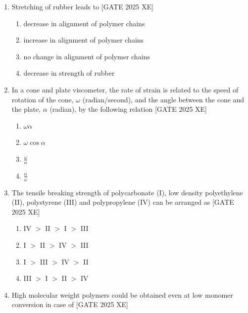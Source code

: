 \documentclass[journal,12pt,onecolumn]{IEEEtran}
\theoremstyle{remark}
\begin{document}
\begin{enumerate}
\item Stretching of rubber leads to \hfill[GATE 2025 XE]

\begin{multicols}{2}
\begin{enumerate}
\item decrease in alignment of polymer chains
\item increase in alignment of polymer chains
\item no change in alignment of polymer chains
\item decrease in strength of rubber
\end{enumerate}
\end{multicols}

\item In a cone and plate viscometer, the rate of strain is related to the speed of rotation of the cone, $\omega$ (radian/second), and the angle between the cone and the plate, $\alpha$ (radian), by the following relation \hfill[GATE 2025 XE]

\begin{multicols}{2}
\begin{enumerate}
\item $\omega \alpha$
\item $\omega \cos \alpha$
\item $\frac{\omega}{\alpha}$
\item $\frac{\alpha}{\omega}$
\end{enumerate}
\end{multicols}

\item The tensile breaking strength of polycarbonate (I), low density polyethylene (II), polystyrene (III) and polypropylene (IV) can be arranged as \hfill[GATE 2025 XE]

\begin{multicols}{2}
\begin{enumerate}
\item IV $>$ II $>$ I $>$ III
\item I $>$ II $>$ IV $>$ III
\item I $>$ III $>$ IV $>$ II
\item III $>$ I $>$ II $>$ IV
\end{enumerate}
\end{multicols}

\item High molecular weight polymers could be obtained even at low monomer conversion in case of \hfill[GATE 2025 XE]


\end{enumerate}
\end{document}
